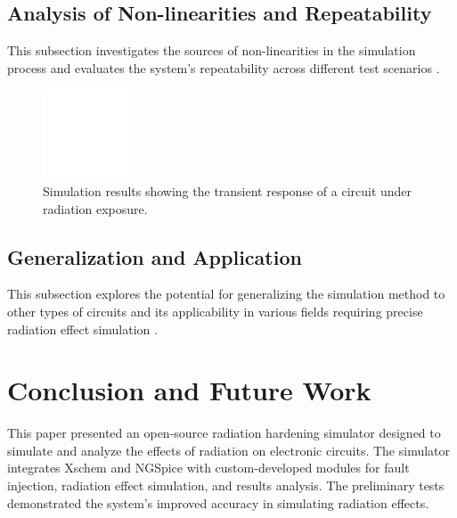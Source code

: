 \documentclass[conference]{IEEEtran}
\begin{document}
\subsection{Analysis of Non-linearities and Repeatability}
This subsection investigates the sources of non-linearities in the simulation process and evaluates the system's repeatability across different test scenarios \cite{Pepper1990}.

\begin{figure}[htbp]
\centering
\includegraphics[width=0.8\linewidth]{simulation_results_placeholder.png}
\caption{Simulation results showing the transient response of a circuit under radiation exposure.}
\label{fig:simulation_results}
\end{figure}

\subsection{Generalization and Application}
This subsection explores the potential for generalizing the simulation method to other types of circuits and its applicability in various fields requiring precise radiation effect simulation \cite{Pepper1990}.

\section{Conclusion and Future Work}
This paper presented an open-source radiation hardening simulator designed to simulate and analyze the effects of radiation on electronic circuits. The simulator integrates Xschem and NGSpice with custom-developed modules for fault injection, radiation effect simulation, and results analysis. The preliminary tests demonstrated the system's improved accuracy in simulating radiation effects.
\end{document}
